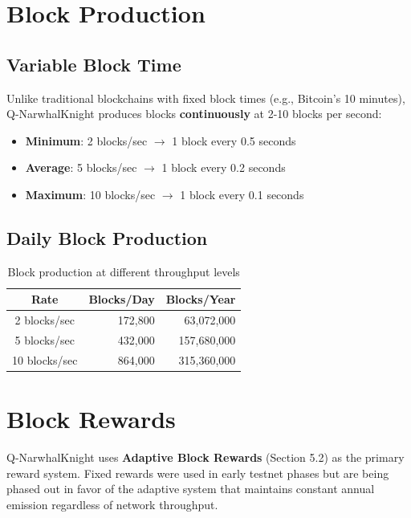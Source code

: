 \documentclass[11pt,a4paper]{article}
\begin{document}
\section{Block Production}

\subsection{Variable Block Time}

Unlike traditional blockchains with fixed block times (e.g., Bitcoin's 10 minutes), Q-NarwhalKnight produces blocks \textbf{continuously} at 2-10 blocks per second:

\begin{itemize}
    \item \textbf{Minimum}: 2 blocks/sec $\rightarrow$ 1 block every 0.5 seconds
    \item \textbf{Average}: 5 blocks/sec $\rightarrow$ 1 block every 0.2 seconds
    \item \textbf{Maximum}: 10 blocks/sec $\rightarrow$ 1 block every 0.1 seconds
\end{itemize}

\subsection{Daily Block Production}

\begin{table}[h]
\centering
\begin{tabular}{crr}
\toprule
\textbf{Rate} & \textbf{Blocks/Day} & \textbf{Blocks/Year} \\
\midrule
2 blocks/sec & 172,800 & 63,072,000 \\
5 blocks/sec & 432,000 & 157,680,000 \\
10 blocks/sec & 864,000 & 315,360,000 \\
\bottomrule
\end{tabular}
\caption{Block production at different throughput levels}
\end{table}

\section{Block Rewards}

\begin{tcolorbox}[colback=accentcolor!10, colframe=accentcolor, title=⚠️ Important Note]
Q-NarwhalKnight uses \textbf{Adaptive Block Rewards} (Section 5.2) as the primary reward system. Fixed rewards were used in early testnet phases but are being phased out in favor of the adaptive system that maintains constant annual emission regardless of network throughput.
\end{tcolorbox}
\end{document}
